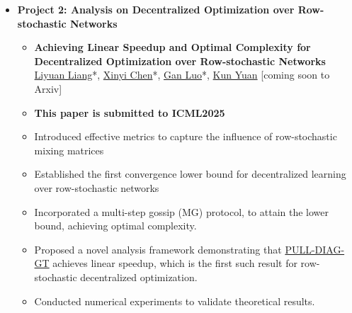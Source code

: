\begin{itemize}
\begin{itemize}
              \item \textbf{Project 2: Analysis on Decentralized
Optimization over Row-stochastic Networks}
              \begin{itemize}
              \item \textbf{Achieving Linear Speedup and Optimal Complexity for Decentralized Optimization over Row-stochastic Networks}\\
              \href{https://lavaei.ieor.berkeley.edu/Group.html}{Liyuan Liang}*, \href{https://openreview.net/profile?id=~Xinyi_Chen9}{Xinyi Chen}*, \underline{Gan Luo}*, \href{https://kunyuan827.github.io}{Kun Yuan} [coming soon to Arxiv]
                  \item {\textbf{This paper is submitted to ICML2025}}
                  \item {Introduced effective metrics to capture the influence of row-stochastic mixing matrices}
                  \item {Established the first convergence lower bound for decentralized learning over row-stochastic networks}
                  \item {Incorporated a multi-step gossip (MG) protocol, to attain the lower bound, achieving optimal complexity.}
                  \item {Proposed a novel analysis framework demonstrating that \href{https://arxiv.org/pdf/1803.09169}{PULL-DIAG-GT} achieves linear speedup, which is the first such result for row-stochastic decentralized optimization.}
                  \item{Conducted numerical experiments to validate theoretical results.}
              \end{itemize}
          \end{itemize}


\end{itemize}
